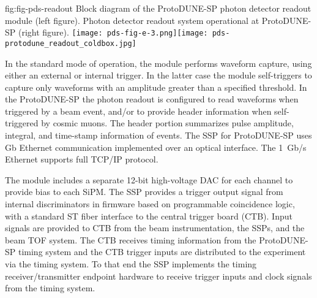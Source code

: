  \begin{dunefigure}
 {fig:fig-pds-readout}
 {Block diagram of the ProtoDUNE-SP photon detector readout module (left figure). Photon detector readout system operational at ProtoDUNE-SP (right figure). }
\texttt{[image: pds-fig-e-3.png]}\texttt{[image: pds-protodune\_readout\_coldbox.jpg]}
\end{dunefigure}

In the standard mode of operation, the module performs waveform capture, using either an external or internal trigger. In the latter case the 
module self-triggers to capture only waveforms with an amplitude greater than a specified threshold. In the ProtoDUNE-SP the photon readout 
is configured to read waveforms when triggered by a beam event, and/or to provide header information when self-triggered by cosmic muons.
The header portion summarizes pulse amplitude, integral, and time-stamp information of events. The SSP for ProtoDUNE-SP uses \si{Gb} Ethernet 
communication implemented over an optical interface. The \SI{1}{Gb/s} Ethernet supports full TCP/IP protocol.  

The module includes a separate \num{12}-bit high-voltage DAC for each channel to provide bias to each SiPM. The SSP provides a trigger output signal 
from internal discriminators in firmware based on programmable coincidence logic, with a standard ST fiber interface to the central trigger board (CTB).
Input signals are provided to CTB from the beam instrumentation, the SSPs, and the beam TOF system. The CTB receives timing information from 
the ProtoDUNE-SP timing system and the CTB trigger inputs are distributed to the experiment via the timing system.
To that end the SSP implements the timing receiver/transmitter endpoint hardware to receive trigger inputs and clock signals from the timing system.

